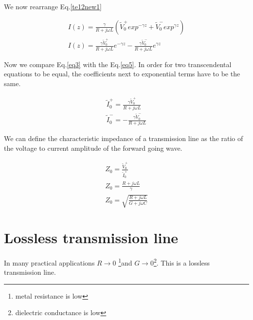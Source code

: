 \documentclass{ximera}
\begin{document}
We now rearrange Eq.\ref{te12new1}

\begin{eqnarray}
I(z)=\frac{\gamma}{R+j\omega L} ( \tilde{V}_0^+ exp^{-\gamma z} + \tilde{V}_0^-
 exp^{\gamma z})  \nonumber  \\
I(z)=\frac{\gamma \tilde{V}_0^+}{R+ j \omega L} e^{-\gamma z} - \frac{\gamma \tilde{V}_0^-}{R+ j \omega L} e^{\gamma z} \label{eq3}
\end{eqnarray}

Now we compare Eq.\ref{eq3} with the Eq.\ref{eq5}. In order for two transcendental equations to be equal, the coefficients next to exponential terms have to be the same.

\begin{eqnarray}
\tilde{I}_0^+=\frac{\gamma \tilde{V}_0^+}{R+ j \omega L} \nonumber  \\
\tilde{I}_0^-= - \frac{\gamma \tilde{V}_0^-}{R+ j \omega L} \nonumber
\end{eqnarray}

We can define the characteristic impedance of a transmission line as
the ratio of the voltage to current amplitude of the forward going
wave.


\begin{eqnarray}
Z_0=\frac{\tilde{V}_0^+}{ \tilde{I}_0^+} \nonumber   \\ \nonumber
Z_0=\frac{R+j\omega L}{\gamma} \nonumber   \\ \nonumber
Z_0=\sqrt{\frac{R+j\omega L}{G+ j\omega C}}
\end{eqnarray}


\section{Lossless transmission line}


In many practical applications $R\to 0$ \footnote{metal resistance is
low}and $G \to 0$\footnote{dielectric conductance is low}. This is a
lossless transmission line.
\end{document}

